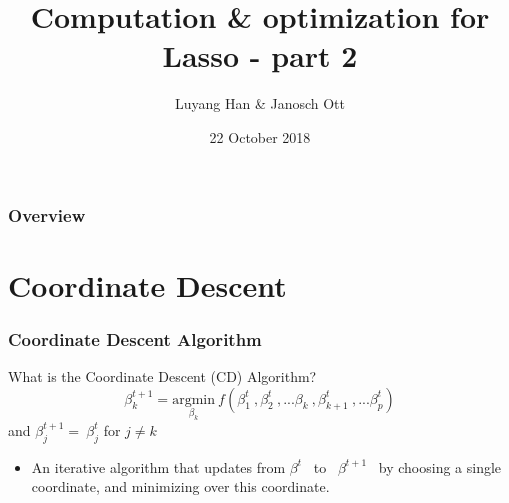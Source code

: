 \documentclass{beamer}
\title[Computation \& optimization]{Computation \& optimization for Lasso - part 2} %
\author{Luyang Han \& Janosch Ott} %
\institute[] %
{
ETH Zürich \\ %
}
\date{22 October 2018} %
\begin{document}
\begin{frame}
\titlepage %
\end{frame}

\begin{frame}
\frametitle{Overview} %
\tableofcontents %
\end{frame}



\section{Coordinate Descent}
\begin{frame}
\frametitle{Coordinate Descent Algorithm}
\begin{block}{What is the Coordinate Descent (CD) Algorithm?}
\begin{equation}    %
            \beta^{t+1}_{k} = \underset{\beta_k}{\mathrm{argmin}}\ f(\beta^{t}_{1}\ ,\beta^{t}_{2}\ ,...\beta_{k}\ ,\beta^{t}_{k+1}\ , ...\beta^{t}_{p})
    \end{equation}
    \; and $\beta^{t+1}_j =\ \beta^{t}_j$ for $j \neq k$
    \vspace*{6mm}
\begin{itemize}
\item  An iterative algorithm that updates from $\beta^t$ \ to \   $\beta^{t+1}$ \  by choosing a single coordinate, and minimizing over this coordinate.
\end{itemize}
\end{block}
\end{frame}
\end{document}
